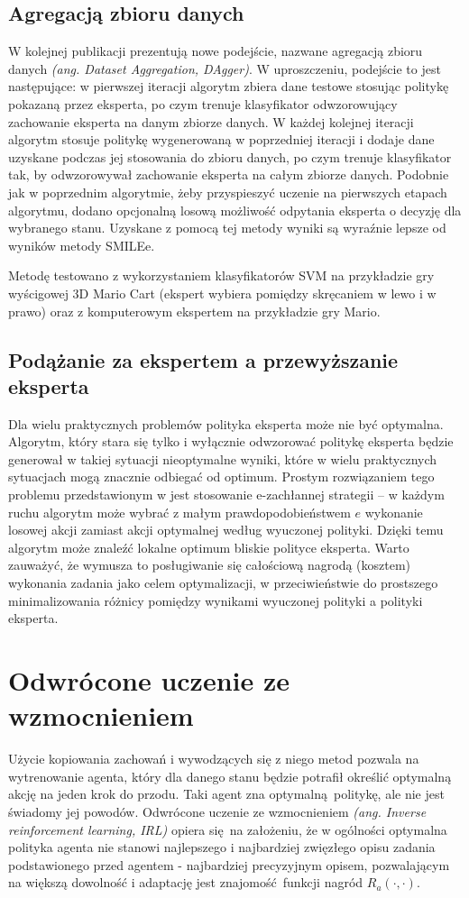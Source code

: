 \documentclass[polish,master,a4paper,oneside]{ppfcmthesis}
\begin{document}
\subsection{Agregacją zbioru danych}\label{dagger_desc}
W kolejnej publikacji \cite{DBLP:journals/corr/abs-1011-0686} prezentują nowe podejście, nazwane agregacją zbioru danych \textit{(ang. Dataset Aggregation, DAgger)}. W uproszczeniu, podejście to jest następujące: w pierwszej iteracji algorytm zbiera dane testowe stosując politykę pokazaną przez eksperta, po czym trenuje klasyfikator odwzorowujący zachowanie eksperta na danym zbiorze danych. W każdej kolejnej iteracji algorytm stosuje politykę wygenerowaną w poprzedniej iteracji i dodaje dane uzyskane podczas jej stosowania do zbioru danych, po czym trenuje klasyfikator tak, by odwzorowywał zachowanie eksperta na całym zbiorze danych. Podobnie jak w poprzednim algorytmie, żeby przyspieszyć uczenie na pierwszych etapach algorytmu, dodano opcjonalną losową możliwość odpytania eksperta o decyzję dla wybranego stanu. Uzyskane z pomocą tej metody wyniki są wyraźnie lepsze od wyników metody SMILEe.

Metodę testowano z wykorzystaniem klasyfikatorów SVM na przykładzie gry wyścigowej 3D Mario Cart (ekspert wybiera pomiędzy skręcaniem w lewo i w prawo) oraz z komputerowym ekspertem na przykładzie gry Mario.

\subsection{Podążanie za ekspertem a przewyższanie eksperta}
Dla wielu praktycznych problemów polityka eksperta może nie być optymalna. Algorytm, który stara się tylko i wyłącznie odwzorować politykę eksperta będzie generował w takiej sytuacji nieoptymalne wyniki, które w wielu praktycznych sytuacjach mogą znacznie odbiegać od optimum. Prostym rozwiązaniem tego problemu przedstawionym w \cite{DBLP:journals/corr/ChangKADL15} jest stosowanie e-zachłannej strategii – w każdym ruchu algorytm może wybrać z małym prawdopodobieństwem $e$ wykonanie losowej akcji zamiast akcji optymalnej według wyuczonej polityki. Dzięki temu algorytm może znaleźć lokalne optimum bliskie polityce eksperta. Warto zauważyć, że wymusza to posługiwanie się całościową nagrodą (kosztem) wykonania zadania jako celem optymalizacji, w przeciwieństwie do prostszego minimalizowania różnicy pomiędzy wynikami wyuczonej polityki a polityki eksperta.
 \section{Odwrócone uczenie ze wzmocnieniem}
Użycie kopiowania zachowań i wywodzących się z niego metod pozwala na wytrenowanie agenta, który dla danego stanu będzie potrafił określić optymalną akcję na jeden krok do przodu. Taki agent zna optymalną politykę, ale nie jest świadomy jej powodów. Odwrócone uczenie ze wzmocnieniem  \textit{(ang. Inverse reinforcement learning, IRL)} opiera się na założeniu, że w ogólności optymalna polityka agenta nie stanowi najlepszego i najbardziej zwięzłego opisu zadania podstawionego przed agentem - najbardziej precyzyjnym opisem, pozwalającym na większą dowolność i adaptację jest znajomość funkcji nagród $R_a(\cdot,\cdot)$.
\end{document}
